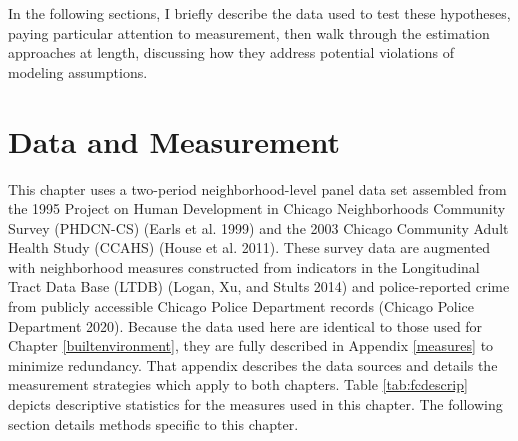 \documentclass [11pt, proquest] {uwthesis}[2015/03/03]
\begin{document}
In the following sections, I briefly describe the data used to test these hypotheses, paying particular attention to measurement, then walk through the estimation approaches at length, discussing how they address potential violations of modeling assumptions.

\hypertarget{data-and-measurement}{%
\section{Data and Measurement}\label{data-and-measurement}}

This chapter uses a two-period neighborhood-level panel data set assembled from the 1995 Project on Human Development in Chicago Neighborhoods Community Survey (PHDCN-CS) (Earls et al. 1999) and the 2003 Chicago Community Adult Health Study (CCAHS) (House et al. 2011). These survey data are augmented with neighborhood measures constructed from indicators in the Longitudinal Tract Data Base (LTDB) (Logan, Xu, and Stults 2014) and police-reported crime from publicly accessible Chicago Police Department records ({Chicago Police Department} 2020). Because the data used here are identical to those used for Chapter \ref{builtenvironment}, they are fully described in Appendix \ref{measures} to minimize redundancy. That appendix describes the data sources and details the measurement strategies which apply to both chapters. Table \ref{tab:fcdescrip} depicts descriptive statistics for the measures used in this chapter. The following section details methods specific to this chapter.

\providecommand{\docline}[3]{\noalign{\global\setlength{\arrayrulewidth}{#1}}\arrayrulecolor[HTML]{#2}\cline{#3}}

\setlength{\tabcolsep}{2pt}
\end{document}
